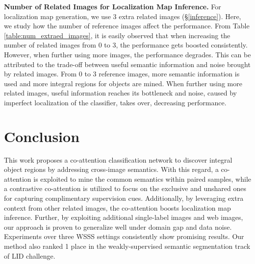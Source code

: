 \documentclass[runningheads]{llncs}
\begin{document}
\noindent\textbf{Number of Related Images for Localization Map Inference.} For localization map generation, we use 3 extra related images (\S\ref{inference}). Here, we study how the number of reference images affect the performance. From Table \ref{table:num_extraed_images}, it is easily observed that when increasing the number of related images from 0 to 3, the performance gets boosted consistently. However, when further using more images, the performance degrades. This can be attributed to the trade-off between useful semantic information and noise brought by related images. From 0 to 3 reference images, more semantic information is used and more integral regions for objects are mined. When further using more related images, useful information reaches its bottleneck and noise, caused by imperfect localization of the classifier, takes over, decreasing performance.



\vspace{-7pt}
\section{Conclusion}
\vspace{-5pt}
This work proposes a co-attention classification network to discover integral object regions by addressing cross-image semantics. With this regard, a co-attention is exploited to mine the common semantics within paired samples, while a contrastive co-attention is utilized to focus on the exclusive and unshared ones for capturing complimentary supervision cues. Additionally, by leveraging extra context from other related images, the co-attention boosts localization map inference. Further, by exploiting additional single-label images and web images, our approach is proven to generalize well under domain gap and data noise. Experiments over three WSSS settings consistently show promising results. Our method also ranked 1 place in the weakly-supervised semantic segmentation track of LID challenge.

{\small


}
\end{document}
